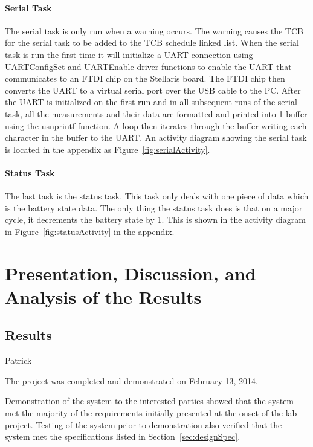 \documentclass[12pt]{article} %
\begin{document}
    \paragraph{Serial Task} The serial task is only run when a warning occurs.
    The warning causes the TCB for the serial task to be added to the TCB
    schedule linked list. When the serial task is run the first time it will
    initialize a UART connection using UARTConfigSet and UARTEnable driver
    functions to enable the UART that communicates to an FTDI chip on the
    Stellaris board. The FTDI chip then converts the UART to a virtual serial
    port over the USB cable to the PC. After the UART is initialized on the
    first run and in all subsequent runs of the serial task, all the
    measurements and their data are formatted and printed into 1 buffer using
    the usnprintf function. A loop then iterates through the buffer writing
    each character in the buffer to the UART. An activity diagram showing the
    serial task is located in the appendix as Figure~\ref{fig:serialActivity}.
    
    \paragraph{Status Task}
    The last task is the status task. This task only deals with one piece of data
    which is the battery state data. The only thing the status task does is that on
    a major cycle, it decrements the battery state by 1. This is shown in the
    activity diagram in Figure~\ref{fig:statusActivity} in the appendix.

    \section{Presentation, Discussion, and Analysis of the Results}

    \subsection{Results} Patrick

    The project was completed and demonstrated on February 13, 2014.

    Demonstration of the system to the interested parties showed that the
    system met the majority of the requirements initially presented at the onset of the lab
    project.  Testing of the system prior to demonstration also verified that
    the system met the specifications listed in Section~\ref{sec:designSpec}.
\end{document}
